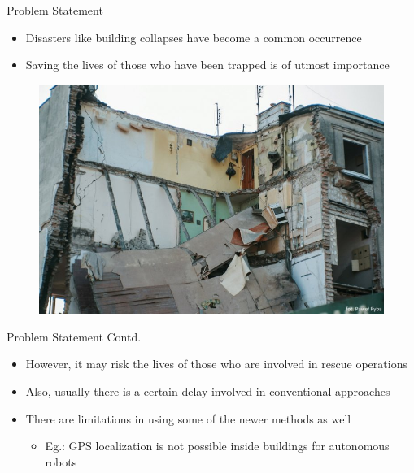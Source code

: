 \documentclass[xcolor=table]{beamer}
\begin{document}
\begin{frame}{Problem Statement}
  \begin{itemize}
  \item Disasters like building collapses have become a common occurrence
  \item Saving the lives of those who have been trapped is of utmost importance
  \end{itemize}
  \begin{figure}
  \includegraphics[scale=0.3]{Collapsed_Building.jpg}
  \end{figure}
\end{frame}

\begin{frame}{Problem Statement Contd.}
  \begin{itemize}
  \item However, it may risk the lives of those who are involved in rescue operations
  \item Also, usually there is a certain delay involved in conventional approaches
  \item There are limitations in using some of the newer methods as well
  	\begin{itemize}
  	\item Eg.: GPS localization is not possible inside buildings for autonomous robots
  	\end{itemize}
  \end{itemize}
\end{frame}
\end{document}

